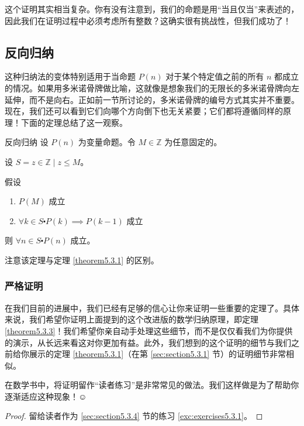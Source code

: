 这个证明其实相当复杂。你有没有注意到，我们的命题是用``当且仅当''来表述的，因此我们在证明过程中必须考虑所有整数？这确实很有挑战性，但我们成功了！

\subsection{反向归纳}

这种归纳法的变体特别适用于当命题 $P(n)$ 对于某个特定值之前的所有 $n$ 都成立的情况。如果用多米诺骨牌做比喻，这就像是想象我们的无限长的多米诺骨牌向左延伸，而不是向右。正如前一节所讨论的，多米诺骨牌的编号方式其实并不重要。现在，我们还可以看到它们向哪个方向倒下也无关紧要；它们都将遵循同样的原理！下面的定理总结了这一观察。

\begin{theorem}{反向归纳}\label{theorem5.3.3}
    设 $P(n)$ 为变量命题。令 $M \in \mathbb{Z}$ 为任意固定的。

    设 $S = {z \in \mathbb{Z} \mid z \le M}$。

    假设
    \begin{enumerate}[label=(\arabic*)]
        \item $P(M)$ 成立
        \item $\forall k \in S \centerdot P(k) \implies P(k - 1)$ 成立
    \end{enumerate}

    则 $\forall n \in S \centerdot P(n)$ 成立。
\end{theorem}

注意该定理与定理 \ref{theorem5.3.1} 的区别。

\subsubsection*{严格证明}

在我们目前的进展中，我们已经有足够的信心让你来证明一些重要的定理了。具体来说，我们希望你证明上面提到的这个改进版的数学归纳原理，即定理 \ref{theorem5.3.3}！我们希望你亲自动手处理这些细节，而不是仅仅看我们为你提供的演示，从长远来看这对你更加有益。此外，我们想到的这个证明的细节与我们之前给你展示的定理 \ref{theorem5.3.1}（在第 \ref{sec:section5.3.1} 节）的证明细节非常相似。

在数学书中，将证明留作``读者练习''是非常常见的做法。我们这样做是为了帮助你逐渐适应这种现象！$\smiley{}$

\begin{proof}
    留给读者作为 \ref{sec:section5.3.4} 节的练习 \ref{exc:exercises5.3.1}。
\end{proof}

